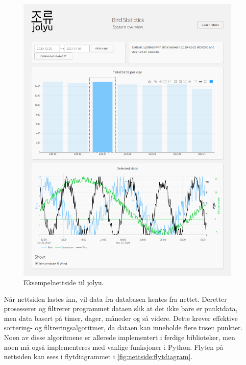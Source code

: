 \begin{figure}[!htbp] 
    \centering
    \includegraphics[width=.9\textwidth]{implementering/nettside/nettside.png}
    \caption{Eksempelnettside til jolyu.}
    \label{fig:nettside:nettside}
\end{figure}

Når nettsiden lastes inn, vil data fra databasen hentes fra nettet. 
Deretter prosesserer og filtrerer programmet dataen slik at det ikke bare er punktdata, men data basert på timer, dager, måneder og så videre. 
Dette krever effektive sortering- og filtreringsalgoritmer, da dataen kan inneholde flere tusen punkter.
Noen av disse algoritmene er allerede implementert i ferdige biblioteker, men noen må også implementeres med vanlige funksjoner i Python. 
Flyten på nettsiden kan sees i flytdiagrammet i \autoref{fig:nettside:flytdiagram}.

